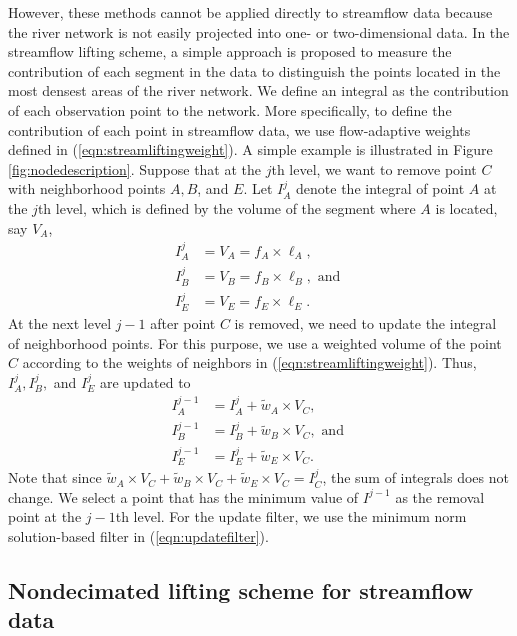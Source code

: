 \documentclass[11pt,titlepage]{article}
\begin{document}
However, these methods cannot be applied directly to streamflow data because the river network is not easily projected into one- or two-dimensional data. In the streamflow lifting scheme, a simple approach is proposed to measure the contribution of each segment in the data to distinguish the points located in the most densest areas of the river network. We define an integral as the contribution of each observation point to the network. More specifically, to define the contribution of each point in streamflow data, we use flow-adaptive weights defined in (\ref{eqn:streamliftingweight}). A simple example is illustrated in Figure \ref{fig:nodedescription}. Suppose that at the $j$th level, we want to remove point $C$ with neighborhood points $A, B$, and $E$. Let $I_A^{j}$ denote the integral of point $A$ at the $j$th level, which is defined by the volume of the segment where $A$ is located, say $V_A$,
\begin{align*}
I_A^{j} &= V_A = f_A\times \ell_A,\nonumber\\
I_B^{j} &= V_B = f_B\times \ell_B, \text{ and }\\
I_E^{j} &= V_E = f_E\times \ell_E.\nonumber
\end{align*}
At the next level $j-1$ after point $C$ is removed, we need to update the integral of neighborhood points. For this purpose, we use a weighted volume of the point $C$ according to the weights of neighbors in (\ref{eqn:streamliftingweight}). Thus, $I_A^{j}, I_{B}^{j},$ and $I_E^{j}$ are updated to
\begin{align*}
I_A^{j-1}&=I_A^{j} + \tilde{w}_A\times V_C,\nonumber\\
I_B^{j-1}&= I_B^{j} + \tilde{w}_B \times V_C, \text{ and }\\
I_E^{j-1} &= I_E^{j} + \tilde{w}_E \times V_C.\nonumber
\end{align*}
Note that since $\tilde{w}_A\times V_C +\tilde{w}_B \times V_C+ \tilde{w}_E \times V_C=I_C^{j}$, the sum of integrals does not  change. We select a point that has the minimum value of $I^{j-1}$ as the removal point at the $j-1$th level. For the update filter, we use the minimum norm solution-based filter in (\ref{eqn:updatefilter}).

\subsection{Nondecimated lifting scheme for streamflow data}
\end{document}
